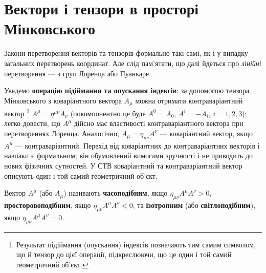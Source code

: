\section{Вектори і тензори в просторі Мінковського}\label{sec:VectAndTensors}

Закони перетворення векторів та тензорів формально такі самі, як і у випадку загальних перетворень координат. Але слід
пам'ятати, що далі йдеться про \textit{лінійні} перетворення --- з груп Лоренца або Пуанкаре.

Уведемо \textbf{операцію підіймання та опускання індексів}: за допомогою тензора Мінковського з коваріантного вектора
$A_\mu$ можна отримати контраваріантний вектор%
\footnote{Результат підіймання (опускання) індексів позначають тим самим символом, що й тензор до цієї операції,
  підкреслюючи, що це один і той самий геометричний об'єкт.} $A^\mu = \eta^{\mu\nu} A_\nu$ (покомпонентно це буде $A^0 =
  A_0$, $A^i = -A_i$, $i=1,2,3$); легко довести, що $A^\mu$ дійсно має властивості контраваріантного вектора при
  перетвореннях Лоренца. Аналогічно, $A_\mu = \eta_{\mu\nu} A^\nu$ --- коваріантний вектор, якщо $A^\mu$ ---
  контраваріантний. Перехід від коваріантних до контраваріантних векторів і навпаки є формальним; він обумовлений
  вимогами зручності і не приводить до нових фізичних сутностей. У СТВ коваріантний та контраваріантний вектор описують
  один і той самий геометричний об'єкт.


Вектор $A^\mu$ (або $A_\mu$) називають \textbf{часоподібним}, якщо $\eta_{\mu\nu}A^\mu A^\nu > 0$,
\textbf{просторовоподібним}, якщо $\eta_{\mu\nu}A^\mu A^\nu < 0$, та \textbf{ізотропним} (або \textbf{світлоподібним}),
якщо $\eta_{\mu\nu}A^\mu A^\nu = 0$.


